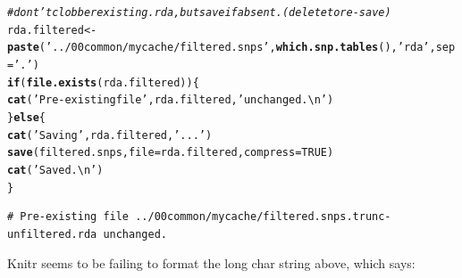 \documentclass{article}\usepackage[]{graphicx}\usepackage[]{color}
\makeatletter
\newcommand{\hlnum}[1]{\textcolor[rgb]{0.686,0.059,0.569}{#1}}%
\newcommand{\hlstr}[1]{\textcolor[rgb]{0.192,0.494,0.8}{#1}}%
\newcommand{\hlcom}[1]{\textcolor[rgb]{0.678,0.584,0.686}{\textit{#1}}}%
\newcommand{\hlstd}[1]{\textcolor[rgb]{0.345,0.345,0.345}{#1}}%
\newcommand{\hlkwa}[1]{\textcolor[rgb]{0.161,0.373,0.58}{\textbf{#1}}}%
\newcommand{\hlkwb}[1]{\textcolor[rgb]{0.69,0.353,0.396}{#1}}%
\newcommand{\hlkwc}[1]{\textcolor[rgb]{0.333,0.667,0.333}{#1}}%
\newcommand{\hlkwd}[1]{\textcolor[rgb]{0.737,0.353,0.396}{\textbf{#1}}}%
\newenvironment{kframe}{%
 \def\at@end@of@kframe{}%
 \ifinner\ifhmode%
  \def\at@end@of@kframe{\end{minipage}}%
  \begin{minipage}{\columnwidth}%
 \fi\fi%
 \def\FrameCommand##1{\hskip\@totalleftmargin \hskip-\fboxsep
 \colorbox{shadecolor}{##1}\hskip-\fboxsep
     \hskip-\linewidth \hskip-\@totalleftmargin \hskip\columnwidth}%
 \MakeFramed {\advance\hsize-\width
   \@totalleftmargin\z@ \linewidth\hsize
   \@setminipage}}%
 {\par\unskip\endMakeFramed%
 \at@end@of@kframe}
\newenvironment{knitrout}{}{} %
\makeatother
\begin{document}
\begin{knitrout}
\begin{kframe}
\begin{alltt}
\hlcom{# dont't clobber existing .rda, but save if absent.  (delete to re-save)}
\hlstd{rda.filtered} \hlkwb{<-} \hlkwd{paste}\hlstd{(}\hlstr{'../00common/mycache/filtered.snps'}\hlstd{,} \hlkwd{which.snp.tables}\hlstd{(),} \hlstr{'rda'}\hlstd{,} \hlkwc{sep}\hlstd{=}\hlstr{'.'}\hlstd{)}
\hlkwa{if}\hlstd{(}\hlkwd{file.exists}\hlstd{(rda.filtered))\{}
  \hlkwd{cat}\hlstd{(}\hlstr{'Pre-existing file'}\hlstd{, rda.filtered,} \hlstr{'unchanged.\textbackslash{}n'}\hlstd{)}
\hlstd{\}} \hlkwa{else} \hlstd{\{}
  \hlkwd{cat}\hlstd{(}\hlstr{'Saving'}\hlstd{, rda.filtered,} \hlstr{'...'}\hlstd{)}
  \hlkwd{save}\hlstd{(filtered.snps,} \hlkwc{file}\hlstd{=rda.filtered,} \hlkwc{compress}\hlstd{=}\hlnum{TRUE}\hlstd{)}
  \hlkwd{cat}\hlstd{(}\hlstr{'Saved.\textbackslash{}n'}\hlstd{)}
\hlstd{\}}
\end{alltt}
\begin{verbatim}
# Pre-existing file ../00common/mycache/filtered.snps.trunc-unfiltered.rda unchanged.
\end{verbatim}
\end{kframe}
\end{knitrout}

Knitr seems to be failing to format the long char string above, which says:
\end{document}
